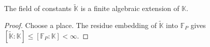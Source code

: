 \begin{corollary}
\label{par-cor-constant-field-finite}
\uses{}
The field of constants $\widetilde{\mathbb K}$ is a finite algebraic extension of
$\mathbb K$.
\end{corollary}
\begin{proof}
Choose a place. The residue embedding of $\widetilde{\mathbb K}$ into
$\mathbb F_P$ gives
$[\widetilde{\mathbb K}:\mathbb K]\leq[\mathbb F_P:\mathbb K]<\infty$.
\end{proof}
